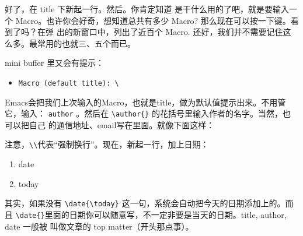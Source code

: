 好了，在 title 下新起一行。然后。你肯定知道 是干什么用的了吧，就是要输入一
个 Macro。也许你会好奇，想知道总共有多少 Macro? 那么现在可以按一下\LKeyTab{}键。看到了吗？在弹
出的新窗口中，列出了近百个 Macro. 还好，我们并不需要记住这么多。最常用的也就三、五个而已。

mini buffer 里又会有提示：

\begin{itemize}
\item[] \verb|Macro (default title): \|
\end{itemize}

Emacs会把我们上次输入的Macro，也就是title，做为默认值提示出来。不用管它，输入：
\texttt{author} 。然后在 \verb|\author{}| 的花括号里输入作者的名字。当然，也可以把自己
的通信地址、email写在里面。就像下面这样：
\begin{codeblock}[.9]
\end{codeblock}
注意，\verb|\\|代表“强制换行”。现在，新起一行，加上日期：

\begin{enumerate}
\item {} date 
\item {} today 
\end{enumerate}

其实，如果没有 \verb|\date{\today}| 这一句，系统会自动把今天的日期添加上的。而
且 \verb|\date{}|里面的日期你可以随意写，不一定非要是当天的日期。title, author, date 一般被
叫做文章的 top matter（开头那点事）。

